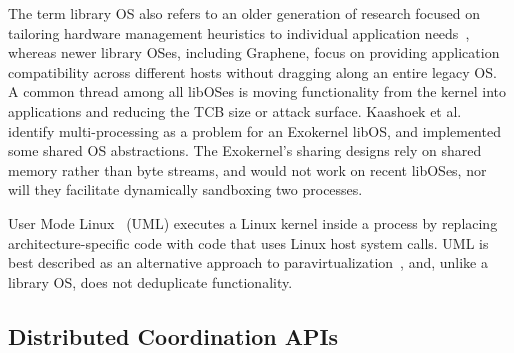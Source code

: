 The term library OS also refers to an older generation of research
focused on tailoring hardware management heuristics 
to individual application needs~\citep{kaashoek97exokernel,anderson92libos,cheriton94cache,leslie96nemesis,libra},
whereas newer library OSes, including Graphene, focus
on providing application compatibility
across different hosts without dragging along an entire legacy OS.
A common thread among all libOSes is moving functionality from the kernel
into applications and reducing the TCB size or attack surface.
Kaashoek et al.~\citep{kaashoek97exokernel} identify multi-processing as a problem for an Exokernel libOS,
and implemented some shared OS abstractions.
The Exokernel's sharing designs rely on shared memory rather than byte streams,
and would not work on recent libOSes,
nor will they facilitate dynamically sandboxing two processes.


\begin{comment}
Dune~\citep{belay12dune} %
leverages virtualization hardware 
to allow an application
to safely manage privileged CPU features
such as page tables and interrupts.
Dune's goals are complimentary to ours; we expect that
certain aspects of the PAL implementation would be simplified on Dune.
\end{comment}

User Mode Linux~\citep{user-mode-linux} (UML) executes a Linux kernel inside a process
by replacing  architecture-specific code with 
code 
that uses Linux host system calls. %
UML is best described as  an alternative approach to paravirtualization~\citep{barham03xen},
and, unlike a library OS, does not deduplicate functionality.

\subsection{Distributed Coordination APIs}

